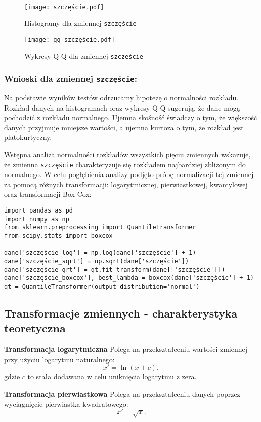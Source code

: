 \documentclass[12pt,a4paper]{article}
\begin{document}
\\
\begin{figure}[H]
    \centering
    \texttt{[image: szczęście.pdf]}
    \caption{Histogramy dla zmiennej \texttt{szczęście}}
\end{figure}
\begin{figure}[H]
    \centering
    \texttt{[image: qq-szczęście.pdf]}
    \caption{Wykresy Q-Q dla zmiennej \texttt{szczęście}}
\end{figure}

\subsubsection*{Wnioski dla zmiennej \texttt{szczęście}:}
Na podstawie wyników testów odrzucamy hipotezę o normalności rozkładu. Rozkład danych na histogramach oraz wykresy Q-Q sugerują, że dane mogą pochodzić z rozkładu normalnego. Ujemna skośność świadczy o tym, że większość danych przyjmuje mniejsze wartości, a ujemna kurtoza o tym, że rozkład jest platokurtyczny.

\newpage
Wstępna analiza normalności rozkładów wszystkich pięciu zmiennych wskazuje, że zmienna \texttt{szczęście} charakteryzuje się rozkładem najbardziej zbliżonym do normalnego. W celu pogłębienia analizy podjęto próbę normalizacji tej zmiennej za pomocą różnych transformacji: logarytmicznej, pierwiastkowej, kwantylowej oraz transformacji Box-Cox:
\begin{lstlisting}
import pandas as pd
import numpy as np
from sklearn.preprocessing import QuantileTransformer
from scipy.stats import boxcox

dane['szczęście_log'] = np.log(dane['szczęście'] + 1)
dane['szczęście_sqrt'] = np.sqrt(dane['szczęście'])
dane['szczęście_qrt'] = qt.fit_transform(dane[['szczęście']])
dane['szczęście_boxcox'], best_lambda = boxcox(dane['szczęście'] + 1)
qt = QuantileTransformer(output_distribution='normal')
\end{lstlisting}
\subsection*{Transformacje zmiennych - charakterystyka teoretyczna \cite{pqstat}}

\textbf{Transformacja logarytmiczna}
Polega na przekształceniu wartości zmiennej przy użyciu logarytmu naturalnego:
$$x'=\ln(x+c),$$
gdzie $c$ to stała dodawana w celu uniknięcia logarytmu z zera.

\vspace{2mm}
\textbf{Transformacja pierwiastkowa}
Polega na przekształceniu danych poprzez wyciągnięcie pierwiastka kwadratowego:
$$x'=\sqrt{x}.$$
\end{document}
